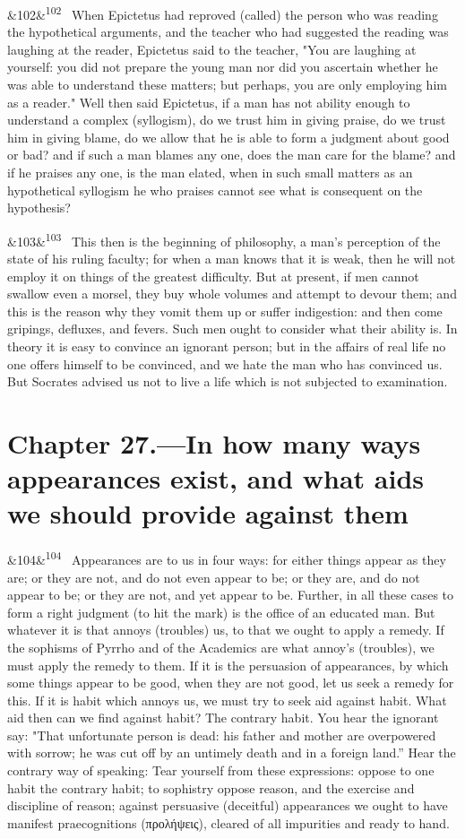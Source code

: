 \documentclass[12pt]{article}
\newcommand{\para}[1][]{\par\noindent\ifx&#1&\else\textsuperscript{\footnotesize #1}~\fi}
\begin{document}
\para[102] When Epictetus had reproved (called) the person who was reading the hypothetical arguments, and the teacher who had suggested the reading was laughing at the reader, Epictetus said to the teacher, "You are laughing at yourself: you did not prepare the young man nor did you ascertain whether he was able to understand these matters; but perhaps, you are only employing him as a reader." Well then said Epictetus, if a man has not ability enough to understand a complex (syllogism), do we trust him in giving praise, do we trust him in giving blame, do we allow that he is able to form a judgment about good or bad? and if such a man blames any one, does the man care for the blame? and if he praises any one, is the man elated, when in such small matters as an hypothetical syllogism he who praises cannot see what is consequent on the hypothesis?

\para[103] This then is the beginning of philosophy, a man's perception of the state of his ruling faculty; for when a man knows that it is weak, then he will not employ it on things of the greatest difficulty. But at present, if men cannot swallow even a morsel, they buy whole volumes and attempt to devour them; and this is the reason why they vomit them up or suffer indigestion: and then come gripings, defluxes, and fevers. Such men ought to consider what their ability is. In theory it is easy to convince an ignorant person; but in the affairs of real life no one offers himself to be convinced, and we hate the man who has convinced us. But Socrates advised us not to live a life which is not subjected to examination.

\section*{Chapter 27.---In how many ways appearances exist, and what aids we should provide against them}

\para[104] Appearances are to us in four ways: for either things appear as they are; or they are not, and do not even appear to be; or they are, and do not appear to be; or they are not, and yet appear to be. Further, in all these cases to form a right judgment (to hit the mark) is the office of an educated man. But whatever it is that annoys (troubles) us, to that we ought to apply a remedy. If the sophisms of Pyrrho and of the Academics are what annoy's (troubles), we must apply the remedy to them. If it is the persuasion of appearances, by which some things appear to be good, when they are not good, let us seek a remedy for this. If it is habit which annoys us, we must try to seek aid against habit. What aid then can we find against habit? The contrary habit. You hear the ignorant say: "That unfortunate person is dead: his father and mother are overpowered with sorrow; he was cut off by an untimely death and in a foreign land.” Hear the contrary way of speaking: Tear yourself from these expressions: oppose to one habit the contrary habit; to sophistry oppose reason, and the exercise and discipline of reason; against persuasive (deceitful) appearances we ought to have manifest praecognitions (προλήψεις), cleared of all impurities and ready to hand.
\end{document}
